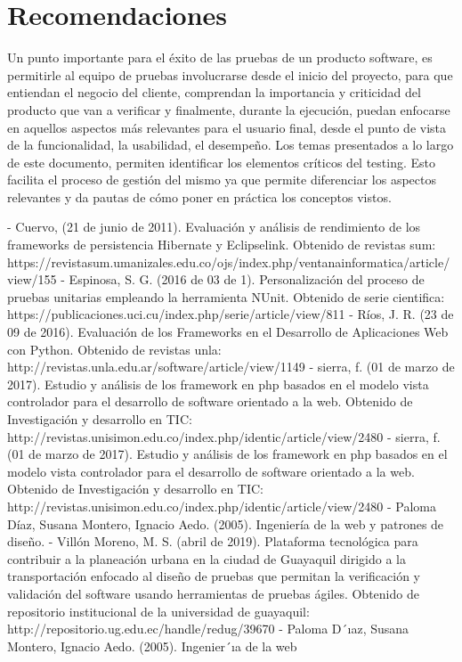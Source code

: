 \documentclass[12pt,letterpaper]{article}
\begin{document}
\section{Recomendaciones}
Un punto importante para el éxito de las pruebas de un producto software, es permitirle al equipo de pruebas involucrarse desde el inicio del proyecto, para que entiendan el negocio del cliente, comprendan la importancia y criticidad del producto que van a verificar y finalmente, durante la ejecución, puedan enfocarse en aquellos aspectos más relevantes para el usuario final, desde el punto de vista de la funcionalidad, la usabilidad, el desempeño.
Los temas presentados a lo largo de este documento, permiten identificar los elementos críticos del testing. Esto facilita el proceso de gestión del mismo ya que permite diferenciar los aspectos relevantes y da pautas de cómo poner en práctica los conceptos vistos.

	

\begin{thebibliography}{XXX0000}

\bibitem - Cuervo, (21 de junio de 2011). Evaluación y análisis de rendimiento de los frameworks de persistencia Hibernate y Eclipselink. Obtenido de revistas sum: https://revistasum.umanizales.edu.co/ojs/index.php/ventanainformatica/article/view/155
\bibitem - Espinosa, S. G. (2016 de 03 de 1). Personalización del proceso de pruebas unitarias empleando la herramienta NUnit. Obtenido de serie cientifica: https://publicaciones.uci.cu/index.php/serie/article/view/811
\bibitem - Ríos, J. R. (23 de 09 de 2016). Evaluación de los Frameworks en el Desarrollo de Aplicaciones Web con Python. Obtenido de revistas unla: http://revistas.unla.edu.ar/software/article/view/1149
\bibitem - sierra, f. (01 de marzo de 2017). Estudio y análisis de los framework en php basados en el modelo vista controlador para el desarrollo de software orientado a la web. Obtenido de Investigación y desarrollo en TIC: http://revistas.unisimon.edu.co/index.php/identic/article/view/2480
\bibitem - sierra, f. (01 de marzo de 2017). Estudio y análisis de los framework en php basados en el modelo vista controlador para el desarrollo de software orientado a la web. Obtenido de Investigación y desarrollo en TIC: http://revistas.unisimon.edu.co/index.php/identic/article/view/2480 
\bibitem - Paloma Díaz, Susana Montero, Ignacio Aedo. (2005). Ingeniería de la web y patrones de diseño.
\bibitem - Villón Moreno, M. S. (abril de 2019). Plataforma tecnológica para contribuir a la planeación urbana en la ciudad de Guayaquil dirigido a la transportación enfocado al diseño de pruebas que permitan la verificación y validación del software usando herramientas de pruebas ágiles. Obtenido de repositorio institucional de la universidad de guayaquil: http://repositorio.ug.edu.ec/handle/redug/39670
\bibitem -  Paloma D´ıaz, Susana Montero, Ignacio Aedo. (2005). Ingenier´ıa de la web
\end{thebibliography}
\end{document}
